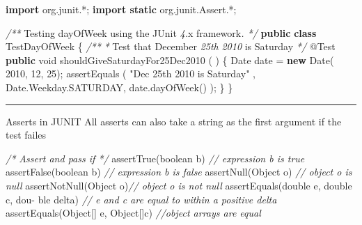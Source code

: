\documentclass[11pt]{article}
\newenvironment{Shaded}{}{}
\newcommand{\KeywordTok}[1]{\textcolor[rgb]{0.00,0.44,0.13}{\textbf{{#1}}}}
\newcommand{\DataTypeTok}[1]{\textcolor[rgb]{0.56,0.13,0.00}{{#1}}}
\newcommand{\DecValTok}[1]{\textcolor[rgb]{0.25,0.63,0.44}{{#1}}}
\newcommand{\StringTok}[1]{\textcolor[rgb]{0.25,0.44,0.63}{{#1}}}
\newcommand{\CommentTok}[1]{\textcolor[rgb]{0.38,0.63,0.69}{\textit{{#1}}}}
\newcommand{\FunctionTok}[1]{\textcolor[rgb]{0.02,0.16,0.49}{{#1}}}
\newcommand{\NormalTok}[1]{{#1}}
\newcommand{\ImportTok}[1]{{#1}}
\newcommand{\BuiltInTok}[1]{{#1}}
\newcommand{\AttributeTok}[1]{\textcolor[rgb]{0.49,0.56,0.16}{{#1}}}
\begin{document}
\begin{Shaded}
\begin{Highlighting}[]
\KeywordTok{import}\ImportTok{ org.junit.*;}
\KeywordTok{import static}\ImportTok{ org.junit.Assert.*;}

\CommentTok{/**}\NormalTok{ Testing dayOfWeek using the JUnit }\CommentTok{4.}\NormalTok{x framework}\CommentTok{. */}
\KeywordTok{public} \KeywordTok{class}\NormalTok{ TestDayOfWeek \{}
    \CommentTok{/**}
    \CommentTok{*}\NormalTok{ Test that December }\CommentTok{25th} \CommentTok{2010}\NormalTok{ is Saturday }
    \CommentTok{*/}
    \AttributeTok{@Test}
    \KeywordTok{public} \DataTypeTok{void} \FunctionTok{shouldGiveSaturdayFor25Dec2010}\NormalTok{ ( ) \{}
        \BuiltInTok{Date}\NormalTok{ date = }\KeywordTok{new} \BuiltInTok{Date}\NormalTok{( }\DecValTok{2010}\NormalTok{, }\DecValTok{12}\NormalTok{, }\DecValTok{25}\NormalTok{); }
        \FunctionTok{assertEquals}\NormalTok{ ( }\StringTok{"Dec 25th 2010 is Saturday"}\NormalTok{ ,}
                        \BuiltInTok{Date}\NormalTok{.}\FunctionTok{Weekday}\NormalTok{.}\FunctionTok{SATURDAY}\NormalTok{, date.}\FunctionTok{dayOfWeek}\NormalTok{() );}
\NormalTok{    \} }
\NormalTok{\}}
\end{Highlighting}
\end{Shaded}

\begin{center}\rule{0.5\linewidth}{\linethickness}\end{center}

Asserts in JUNIT All asserts can also take a string as the first
argument if the test failes

\begin{Shaded}
\begin{Highlighting}[]
\CommentTok{/* Assert and pass if */}
\FunctionTok{assertTrue}\NormalTok{(}\DataTypeTok{boolean}\NormalTok{ b) }\CommentTok{// expression b is true}
\FunctionTok{assertFalse}\NormalTok{(}\DataTypeTok{boolean}\NormalTok{ b) }\CommentTok{// expression b is false}
\FunctionTok{assertNull}\NormalTok{(}\BuiltInTok{Object}\NormalTok{ o) }\CommentTok{// object o is null}
\FunctionTok{assertNotNull}\NormalTok{(}\BuiltInTok{Object}\NormalTok{ o)}\CommentTok{// object o is not null}
\FunctionTok{assertEquals}\NormalTok{(}\DataTypeTok{double}\NormalTok{ e, }\DataTypeTok{double}\NormalTok{ c, dou- ble delta) }\CommentTok{// e and c are equal to within a positive delta}
\FunctionTok{assertEquals}\NormalTok{(}\BuiltInTok{Object}\NormalTok{[] e, }\BuiltInTok{Object}\NormalTok{[]c) }\CommentTok{//object arrays are equal}
\end{Highlighting}
\end{Shaded}
\end{document}
